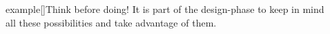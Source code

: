 \begin{frame}
    \begin{columns}[c]
        \begin{column}{0.08\textwidth}
        \end{column}
        \begin{column}{0.4\textwidth}
            \begin{varblock}{example}[\textwidth]{Think before doing!}
                It is part of the design-phase to keep in mind all these possibilities and take advantage of them.
            \end{varblock}
        \end{column}
        \begin{column}{0.52\textwidth}
        \end{column}
    \end{columns}
\end{frame}
